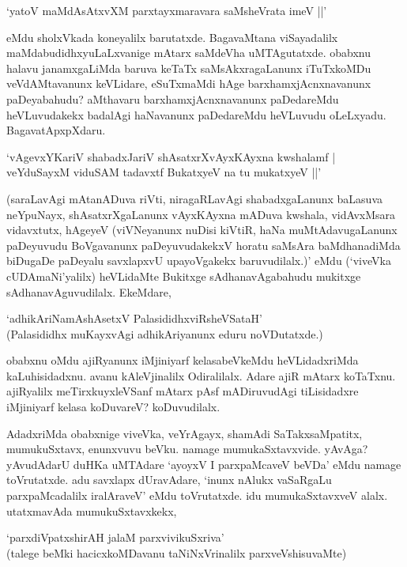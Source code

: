 \begin{shloka}
`yatoV maMdAsAtxvXM parxtayxmaravara saMsheVrata imeV ||'
\end{shloka}

eMdu sholxVkada koneyalilx barutatxde. BagavaMtana viSayadalilx maMdabudidhxyuLaLxvanige mAtarx saMdeVha uMTAgutatxde. obabxnu halavu janamxgaLiMda baruva keTaTx saMsAkxragaLanunx iTuTxkoMDu veVdAMtavanunx keVLidare, eSuTxmaMdi hAge barxhamxjAcnxnavanunx paDeyabahudu? aMthavaru barxhamxjAcnxnavanunx paDedareMdu heVLuvudakekx badalAgi haNavanunx paDedareMdu heVLuvudu oLeLxyadu. BagavatApxpXdaru.

\begin{shloka}
`vAgevxYKariV shabadxJariV shAsatxrXvAyxKAyxna kwshalamf |\\
veYduSayxM viduSAM tadavxtf BukatxyeV na tu mukatxyeV ||'
\end{shloka}

(saraLavAgi mAtanADuva riVti, niragaRLavAgi shabadxgaLanunx baLasuva neYpuNayx, shAsatxrXgaLanunx vAyxKAyxna mADuva kwshala, vidAvxMsara vidavxtutx, hAgeyeV (viVNeyanunx nuDisi kiVtiR, haNa muMtAdavugaLanunx paDeyuvudu BoVgavanunx paDeyuvudakekxV horatu saMsAra baMdhanadiMda biDugaDe paDeyalu savxlapxvU upayoVgakekx baruvudilalx.)' eMdu (`viveVka cUDAmaNi'yalilx) heVLidaMte Bukitxge sAdhanavAgabahudu mukitxge sAdhanavAguvudilalx. EkeMdare,

\begin{shloka}
`adhikAriNamAshAsetxV PalasididhxviRsheVSataH'\\
(Palasididhx muKayxvAgi adhikAriyanunx eduru noVDutatxde.)
\end{shloka}

obabxnu oMdu ajiRyanunx iMjiniyarf kelasabeVkeMdu heVLidadxriMda kaLuhisidadxnu. avanu kAleVjinalilx Odiralilalx. Adare ajiR mAtarx koTaTxnu. ajiRyalilx meTirxkuyxleVSanf mAtarx pAsf mADiruvudAgi tiLisidadxre iMjiniyarf kelasa koDuvareV? koDuvudilalx.

AdadxriMda obabxnige viveVka, veYrAgayx, shamAdi SaTakxsaMpatitx, mumukuSxtavx, enunxvuvu beVku. namage mumukaSxtavxvide. yAvAga? yAvudAdarU duHKa uMTAdare `ayoyxV I parxpaMcaveV beVDa' eMdu namage toVrutatxde. adu savxlapx dUravAdare, `inunx nAlukx vaSaRgaLu parxpaMcadalilx iralAraveV' eMdu toVrutatxde. idu mumukaSxtavxveV alalx. utatxmavAda mumukuSxtavxkekx,

\begin{shloka}
`parxdiVpatxshirAH jalaM parxvivikuSxriva'\\
(talege beMki hacicxkoMDavanu taNiNxVrinalilx parxveVshisuvaMte)
\end{shloka}

